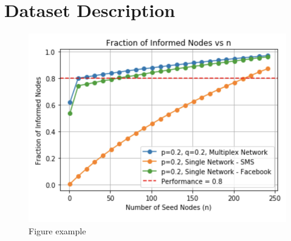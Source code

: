 \section{Dataset Description}
\lipsum[7-10]
\begin{figure}[ht]
    \centering
    \includegraphics[width=0.8\linewidth]{figures/plot_fraction_vs_n_for_single_multiplex_network.png}
    \caption{Figure example}
    \label{fig:enter-label}
\end{figure}
